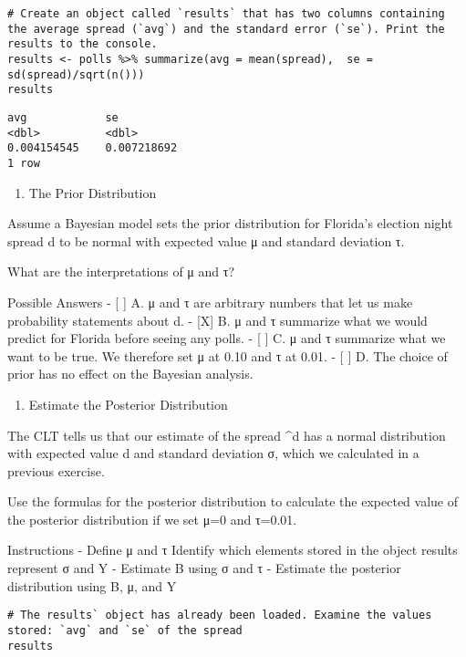 \documentclass[
]{article}
\providecommand{\tightlist}{%
  \setlength{\itemsep}{0pt}\setlength{\parskip}{0pt}}
\begin{document}
\begin{verbatim}
# Create an object called `results` that has two columns containing the average spread (`avg`) and the standard error (`se`). Print the results to the console.
results <- polls %>% summarize(avg = mean(spread),  se = sd(spread)/sqrt(n()))
results
\end{verbatim}

\begin{verbatim}
avg            se
<dbl>          <dbl>
0.004154545    0.007218692
1 row
\end{verbatim}

\begin{enumerate}
\def\labelenumi{\arabic{enumi}.}
\setcounter{enumi}{6}
\tightlist
\item
  The Prior Distribution
\end{enumerate}

Assume a Bayesian model sets the prior distribution for Florida's
election night spread d to be normal with expected value μ and standard
deviation τ.

What are the interpretations of μ and τ?

Possible Answers - {[} {]} A. μ and τ are arbitrary numbers that let us
make probability statements about d. - {[}X{]} B. μ and τ summarize what
we would predict for Florida before seeing any polls. - {[} {]} C. μ and
τ summarize what we want to be true. We therefore set μ at 0.10 and τ at
0.01. - {[} {]} D. The choice of prior has no effect on the Bayesian
analysis.

\begin{enumerate}
\def\labelenumi{\arabic{enumi}.}
\setcounter{enumi}{7}
\tightlist
\item
  Estimate the Posterior Distribution
\end{enumerate}

The CLT tells us that our estimate of the spread \^{}d has a normal
distribution with expected value d and standard deviation σ, which we
calculated in a previous exercise.

Use the formulas for the posterior distribution to calculate the
expected value of the posterior distribution if we set μ=0 and τ=0.01.

Instructions - Define μ and τ Identify which elements stored in the
object results represent σ and Y - Estimate B using σ and τ - Estimate
the posterior distribution using B, μ, and Y

\begin{verbatim}
# The results` object has already been loaded. Examine the values stored: `avg` and `se` of the spread
results
\end{verbatim}
\end{document}

